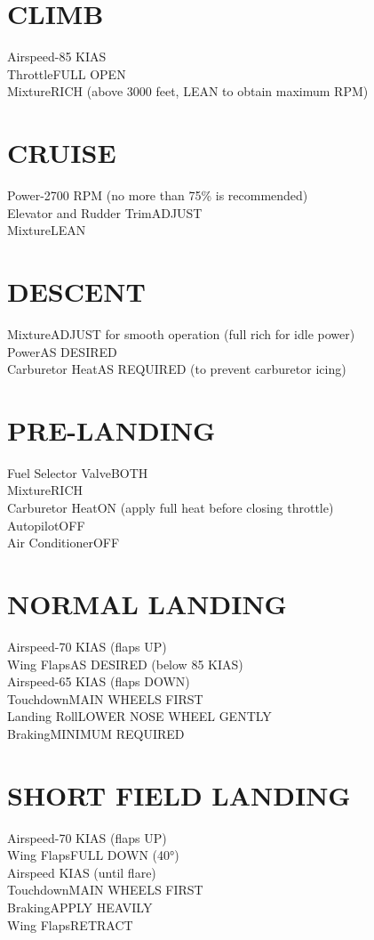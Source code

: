 \documentclass{article}
\begin{document}
\begin{multicols*}{2}
\section*{CLIMB}
Airspeed-85 KIAS\\
Throttle\dotfill FULL OPEN\\
Mixture\dotfill RICH (above 3000 feet, LEAN to obtain maximum RPM)\\
\section*{CRUISE}
Power-2700 RPM (no more than 75\% is recommended)\\
Elevator and Rudder Trim\dotfill ADJUST\\
Mixture\dotfill LEAN
\section*{DESCENT}
Mixture\dotfill ADJUST for smooth operation (full rich for idle power)\\
Power\dotfill AS DESIRED\\
Carburetor Heat\dotfill AS REQUIRED (to prevent carburetor icing)
\section*{PRE-LANDING}
Fuel Selector Valve\dotfill BOTH\\
Mixture\dotfill RICH\\
Carburetor Heat\dotfill ON (apply full heat before closing throttle)\\
Autopilot\dotfill OFF\\
Air Conditioner\dotfill OFF
\section*{NORMAL LANDING}
Airspeed-70 KIAS (flaps UP)\\
Wing Flaps\dotfill AS DESIRED (below 85 KIAS)\\
Airspeed-65 KIAS (flaps DOWN)\\
Touchdown\dotfill MAIN WHEELS FIRST\\
Landing Roll\dotfill LOWER NOSE WHEEL GENTLY\\
Braking\dotfill MINIMUM REQUIRED
\section*{SHORT FIELD LANDING}
Airspeed-70 KIAS (flaps UP)\\
Wing Flaps\dotfill FULL DOWN (40°)\\
Airspeed KIAS (until flare)\\
Touchdown\dotfill MAIN WHEELS FIRST\\
Braking\dotfill APPLY HEAVILY\\
Wing Flaps\dotfill RETRACT

\end{multicols*}
\end{document}
